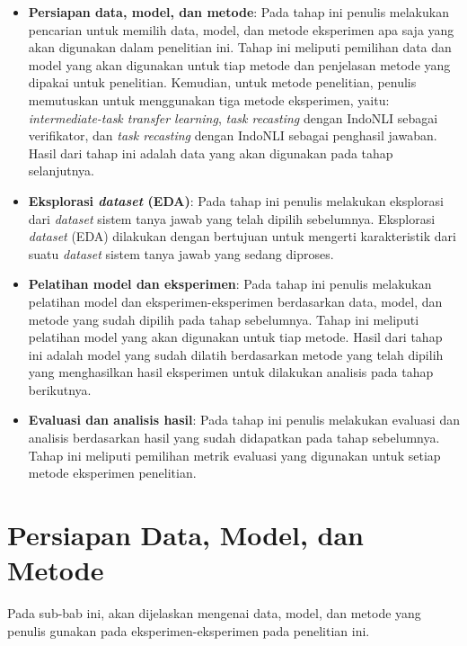 \begin{itemize}
    
    \item \textbf{Persiapan data, model, dan metode}: Pada tahap ini penulis melakukan pencarian untuk memilih data, model, dan metode eksperimen apa saja yang akan digunakan dalam penelitian ini. Tahap ini meliputi pemilihan data dan model yang akan digunakan untuk tiap metode dan penjelasan metode yang dipakai untuk penelitian. Kemudian, untuk metode penelitian, penulis memutuskan untuk menggunakan tiga metode eksperimen, yaitu: \emph{intermediate-task transfer learning}, \emph{task recasting} dengan IndoNLI sebagai verifikator, dan \emph{task recasting} dengan IndoNLI sebagai penghasil jawaban. Hasil dari tahap ini adalah data yang akan digunakan pada tahap selanjutnya.

    \item \textbf{Eksplorasi \emph{dataset} (EDA)}: Pada tahap ini penulis melakukan eksplorasi dari \emph{dataset} sistem tanya jawab yang telah dipilih sebelumnya. Eksplorasi \emph{dataset} (EDA) dilakukan dengan bertujuan untuk mengerti karakteristik dari suatu \emph{dataset} sistem tanya jawab yang sedang diproses.
    
    \item \textbf{Pelatihan model dan eksperimen}: Pada tahap ini penulis melakukan pelatihan model dan eksperimen-eksperimen berdasarkan data, model, dan metode yang sudah dipilih pada tahap sebelumnya. Tahap ini meliputi pelatihan model yang akan digunakan untuk tiap metode. Hasil dari tahap ini adalah model yang sudah dilatih berdasarkan metode yang telah dipilih yang menghasilkan hasil eksperimen untuk dilakukan analisis pada tahap berikutnya.

    \item \textbf{Evaluasi dan analisis hasil}: Pada tahap ini penulis melakukan evaluasi dan analisis berdasarkan hasil yang sudah didapatkan pada tahap sebelumnya. Tahap ini meliputi pemilihan metrik evaluasi yang digunakan untuk setiap metode eksperimen penelitian.

\end{itemize}

\section{Persiapan Data, Model, dan Metode}
Pada sub-bab ini, akan dijelaskan mengenai data, model, dan metode yang penulis gunakan pada eksperimen-eksperimen pada penelitian ini. 

